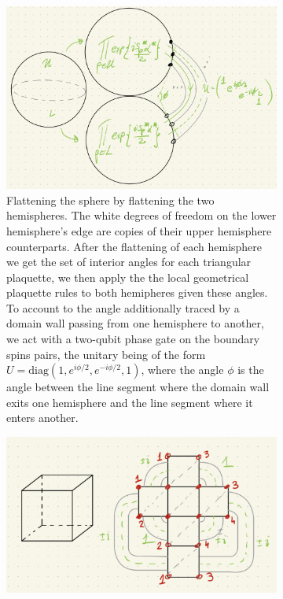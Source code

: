 \documentclass[a4paper,twocolumn,11pt]{quantumarticle}
\begin{document}
\begin{figure}
     \centering
     \begin{subfigure}[b]{\textwidth}
         \centering
         \includegraphics[width=\textwidth]{Figures/hemisphere_surg.png}
         \caption{Flattening the sphere by flattening the two hemispheres. The white degrees of freedom on the lower hemisphere's edge are copies of their upper hemisphere counterparts. After the flattening of each hemisphere we get the set of interior angles for each triangular plaquette, we then apply the the local geometrical plaquette rules to both hemipheres given these angles. To account to the angle additionally traced by a domain wall passing from one hemisphere to another, we act with a two-qubit phase gate on the boundary spins pairs, the unitary being of the form $U = \text{diag}(1, e^{i\phi/2}, e^{-i\phi/2}, 1)$, where the angle $\phi$ is the angle between the line segment where the domain wall exits one hemisphere and the line segment where it enters another.}
         \label{fig:surg_sphere}
     \end{subfigure}
     \hfill
     \begin{subfigure}[b]{0.4\textwidth}
         \centering
         \includegraphics[width=\textwidth]{Figures/cube_surg.png}

\end{subfigure}
\end{figure}
\end{document}

